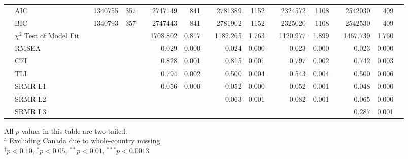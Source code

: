 {\begin{tabular}{l @{\hskip -8.1cm} l c rr l rr l rr l rr l rr l}
    \cmidrule{4-5}\cmidrule{7-8}\cmidrule{10-11}\cmidrule{13-14}\cmidrule{16-17}          & AIC   && 1340755 & 357   &       & 2747149 & 841   &       & 2781389 & 1152  &       & 2324572 & 1108  &       & 2542030 & 409   &  \\
              & BIC   && 1340793 & 357   &       & 2747443 & 841   &       & 2781902 & 1152  &       & 2325020 & 1108  &       & 2542530 & 409   &  \\
              & $\chi^2$ Test of Model Fit &&       &       &       & 1708.802 & 0.817 &       & 1182.265 & 1.763 &       & 1120.977 & 1.899 &       & 1467.739 & 1.760 &  \\
              & RMSEA &&       &       &       & 0.029 & 0.000 &       & 0.024 & 0.000 &       & 0.023 & 0.000 &       & 0.023 & 0.000 &  \\
              & CFI   &&       &       &       & 0.828 & 0.001 &       & 0.815 & 0.001 &       & 0.797 & 0.002 &       & 0.742 & 0.003 &  \\
              & TLI   &&       &       &       & 0.794 & 0.002 &       & 0.500 & 0.004 &       & 0.543 & 0.004 &       & 0.500 & 0.006 &  \\
              & SRMR L1 &&       &       &       & 0.056 & 0.000 &       & 0.052 & 0.000 &       & 0.052 & 0.001 &       & 0.048 & 0.000 &  \\
              & SRMR L2 &&       &       &       &       &       &       & 0.063 & 0.001 &       & 0.082 & 0.001 &       & 0.065 & 0.000 &  \\
              & SRMR L3 &&       &       &       &       &       &       &       &       &       &       &       &       & 0.287 & 0.001 &  \\
        \bottomrule
    \end{tabular}
}{All $p$ values in this table are two-tailed. \\
$^\text{a}$ Excluding Canada due to whole-country missing.\\
$^\dagger p < 0.10$, $^* p < 0.05$, $^{**} p < 0.01$, $^{***} p < 0.001$}{3}

